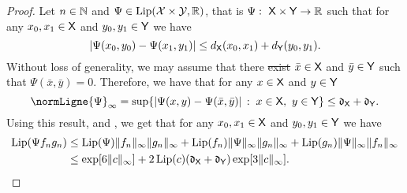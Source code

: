 \documentclass[11pt,a4paper]{article}
\providecommand{\DIFaddtex}[1]{{\protect\color{blue}\uwave{#1}}} %
\providecommand{\DIFdeltex}[1]{{\protect\color{red}\sout{#1}}}                      %
\providecommand{\DIFaddbegin}{} %
\providecommand{\DIFaddend}{} %
\providecommand{\DIFdelbegin}{} %
\providecommand{\DIFdelend}{} %
\providecommand{\DIFadd}[1]{\texorpdfstring{\DIFaddtex{#1}}{#1}} %
\providecommand{\DIFdel}[1]{\texorpdfstring{\DIFdeltex{#1}}{}} %
\begin{document}
\begin{proof}
  Let $n \in \mathbb{N}$ and $\Psi\in \operatorname{Lip}(\mathcal{X}\times\mathcal{Y}, \mathbb{R})$, that is $\Psi: \ \mathsf{X} \times \mathsf{Y} \to \mathbb{R}$ such that for any
  $x_0,x_1 \in \mathsf{X}$ and $y_0, y_1 \in \mathsf{Y}$ we have
  \begin{equation}
    |\Psi(x_0,y_0) - \Psi(x_1,y_1)| \leq d_{\mathsf{X}}(x_0,x_1)+d_{\mathsf{Y}}(y_0,y_1). 
  \end{equation}
  Without loss of generality, we may assume that there \DIFdelbegin \DIFdel{exist }\DIFdelend \DIFaddbegin \DIFadd{exists }\DIFaddend $\bar{x} \in \mathsf{X}$ and
  $\bar{y} \in \mathsf{Y}$ such that $\Psi(\bar{x}, \bar{y}) = 0$. Therefore, we have
  that for any $x \in \mathsf{X}$ and $y \in \mathsf{Y}$
  \begin{equation}
    \label{eq:inf_Psi}
    \normLigne{\Psi}_\infty = \sup \ensembleLigne{\abs{\Psi(x,y) - \Psi(\bar{x},\bar{y})}}{x \in \msx, \ y \in \msy} \leq \diam_\msx +  \diam_\msy.
  \end{equation}
 Using
  this result,  and , we get that for any
  $x_0, x_1 \in \mathsf{X}$ and $y_0, y_1 \in \mathsf{Y}$ we have
  \begin{align}
      \operatorname{Lip}(\Psi f_n g_n)
      &\leq \operatorname{Lip}(\Psi) \|f_n\|_\infty \|g_n\|_\infty + 
      \operatorname{Lip}(f_n) \|\Psi\|_\infty \|g_n\|_\infty + \operatorname{Lip}(g_n) 
      \|\Psi \|_\infty \|f_n\|_\infty\\
      &\leq \exp[6\|c\|_\infty] + 2\operatorname{Lip}(c)(\mathfrak{d}_{\mathsf{X}}+\mathfrak{d}_{\mathsf{Y}})\exp[3\|c\|_\infty].
  \end{align}


\end{proof}
\end{document}
